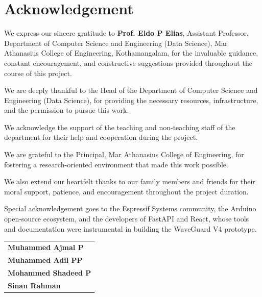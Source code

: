 
\chapter*{Acknowledgement}

We express our sincere gratitude to \textbf{Prof. Eldo P Elias}, Assistant Professor,
Department of Computer Science and Engineering (Data Science), Mar Athanasius College of
Engineering, Kothamangalam, for the invaluable guidance, constant encouragement, and
constructive suggestions provided throughout the course of this project.

We are deeply thankful to the Head of the Department of Computer Science and Engineering
(Data Science), for providing the necessary resources, infrastructure, and the permission
to pursue this work.

We acknowledge the support of the teaching and non-teaching staff of the department for
their help and cooperation during the project.

We are grateful to the Principal, Mar Athanasius College of Engineering, for fostering
a research-oriented environment that made this work possible.

We also extend our heartfelt thanks to our family members and friends for their moral
support, patience, and encouragement throughout the project duration.

Special acknowledgement goes to the Espressif Systems community, the Arduino open-source
ecosystem, and the developers of FastAPI and React, whose tools and documentation were
instrumental in building the WaveGuard V4 prototype.

\vspace{40pt}
\begin{flushright}
  \begin{tabular}{l}
    \textbf{Muhammed Ajmal P}    \\[4pt]
    \textbf{Muhammed Adil PP}    \\[4pt]
    \textbf{Mohammed Shadeed P}  \\[4pt]
    \textbf{Sinan Rahman}        \\
  \end{tabular}
\end{flushright}
